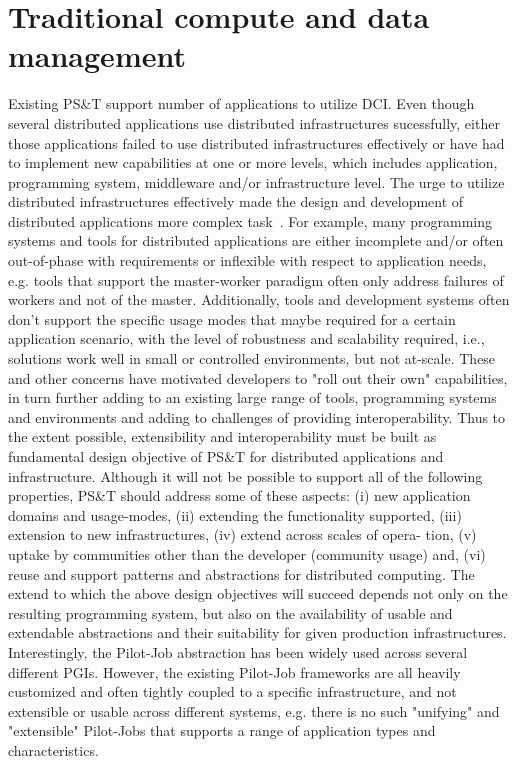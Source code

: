\documentclass[12pt]{report}
\begin{document}
\section{Traditional compute and data management} \label{sec:trad-cd-mgmt}

Existing PS\&T support number of applications to utilize DCI. Even though several distributed applications use distributed infrastructures sucessfully, either those applications failed to use distributed infrastructures effectively or have had to implement new capabilities at one or more levels, which includes application, programming system, middleware and/or infrastructure level.  The urge to utilize distributed infrastructures effectively made the design and development of distributed applications more complex task~\cite{bigjob-2}. For example, many programming systems and tools for distributed applications are either incomplete and/or often out-of-phase with requirements or inflexible with respect to application needs, e.g. tools that support the master-worker paradigm often only address failures of workers and not of the master. Additionally, tools and development systems often don't support the specific usage modes that maybe required for a certain application scenario, with the level of robustness and scalability required, i.e., solutions work well in small or controlled environments, but not at-scale.  These and other concerns have motivated developers to "roll out their own" capabilities, in turn further adding to an existing large range of tools, programming systems and environments and adding to challenges of providing interoperability. Thus to the extent possible, extensibility and interoperability must be built as fundamental design objective of PS\&T for distributed applications and infrastructure.  Although it will not be possible to support all of the following properties, PS\&T should address some of these aspects: (i) new application domains and usage-modes, (ii) extending the functionality supported, (iii) extension to new infrastructures, (iv) extend across scales of opera- tion, (v) uptake by communities other than the developer (community usage) and, (vi) reuse and support patterns and abstractions for distributed computing.  The extend to which the above design objectives will succeed depends not only on the resulting programming system, but also on the availability of usable and extendable abstractions and their suitability for given production infrastructures. Interestingly, the Pilot-Job abstraction has been widely used across several different PGIs. However, the existing Pilot-Job frameworks are all heavily customized and often tightly coupled to a specific infrastructure, and not extensible or usable across different systems, e.g. there is no such "unifying" and "extensible" Pilot-Jobs that supports a range of application types and characteristics. ~\cite{bigjob-1,bigjob-2}
\end{document}
